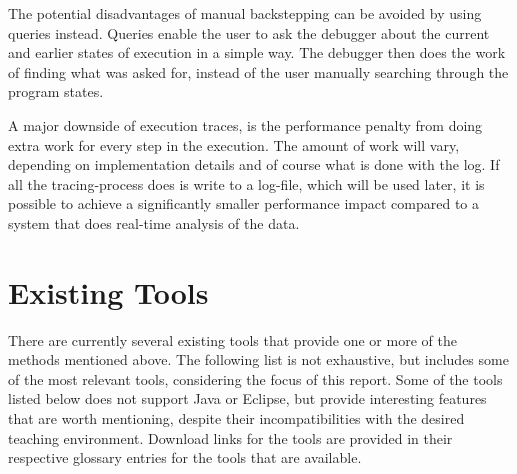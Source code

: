 The potential disadvantages of manual backstepping can be avoided by using queries instead.
Queries enable the user to ask the debugger about the current and earlier states of execution in a simple way.
The debugger then does the work of finding what was asked for, instead of the user manually searching through the program states.

A major downside of execution traces, is the performance penalty from doing extra work for every step in the execution.
The amount of work will vary, depending on implementation details and of course what is done with the log.
If all the tracing-process does is write to a log-file, which will be used later, it is possible to achieve a significantly smaller performance impact compared to a system that does real-time analysis of the data.

\section{Existing Tools}\label{PreTools}%

There are currently several existing tools that provide one or more of the methods mentioned above.
The following list is not exhaustive, but includes some of the most relevant tools, considering the focus of this report.
Some of the tools listed below does not support Java or Eclipse, but provide interesting features that are worth mentioning, despite their incompatibilities with the desired teaching environment.
Download links for the tools are provided in their respective glossary entries for the tools that are available.

